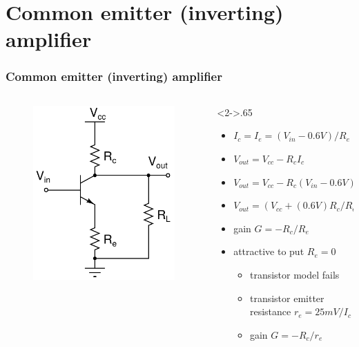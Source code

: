 \documentclass[beamer]{standalone}
\begin{document}
\section{Common emitter (inverting) amplifier}
\frame
{ \frametitle{Common emitter (inverting) amplifier}
\begin{columns}[c]
	\begin{column}{.35\textwidth}
		\begin{figure}
			\includegraphics[height=0.50\textheight]{./schematics/npn_common_emitter_amplifier}
		\end{figure}
	\end{column}
	\begin{column}<2->{.65\textwidth}
		\begin{itemize}
			\item $I_c=I_e=(V_{in}-0.6V)/R_e$		
			\item $V_{out}=V_{cc}-R_c I_c$
			\item $V_{out}=V_{cc}-R_c (V_{in}-0.6V)/R_e$
			\item $V_{out}=(V_{cc}+(0.6V) R_c/R_e) -V_{in} R_c/R_e$
			\item gain $G=-R_c/R_e$
			\item attractive to put $R_e=0$
			\begin{itemize}
				\item transistor model fails
				\item transistor emitter resistance $r_e=25mV/I_c$
				\item gain $G=-R_c/r_e$
			\end{itemize}
		\end{itemize}
	\end{column}
\end{columns}
	
	}
\end{document}
